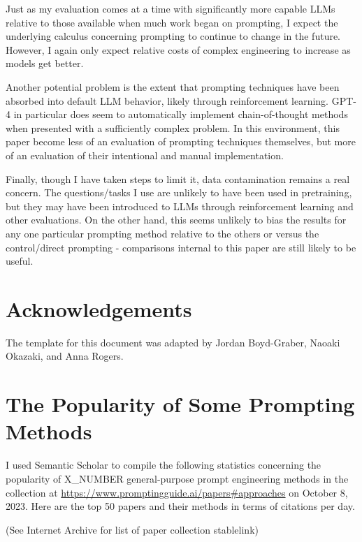 \documentclass[11pt]{article}
\begin{document}
Just as my evaluation comes at a time with significantly more capable LLMs relative to those available when much work began on prompting, I expect the underlying calculus concerning prompting to continue to change in the future. However, I again only expect relative costs of complex engineering to increase as models get better.

Another potential problem is the extent that prompting techniques have been absorbed into default LLM behavior, likely through reinforcement learning. GPT-4 in particular does seem to automatically implement chain-of-thought methods when presented with a sufficiently complex problem. In this environment, this paper become less of an evaluation of prompting techniques themselves, but more of an evaluation of their intentional and manual implementation.

Finally, though I have taken steps to limit it, data contamination remains a real concern. The questions/tasks I use are unlikely to have been used in pretraining, but they may have been introduced to LLMs through reinforcement learning and other evaluations. On the other hand, this seems unlikely to bias the results for any one particular prompting method relative to the others or versus the control/direct prompting - comparisons internal to this paper are still likely to be useful.

\section*{Acknowledgements}
The template for this document was adapted by Jordan Boyd-Graber, Naoaki Okazaki, and Anna Rogers.




\appendix

\section{The Popularity of Some Prompting Methods}

I used Semantic Scholar \cite{noauthor_semantic_nodate} to compile the following statistics concerning the popularity of X_NUMBER general-purpose prompt engineering methods in the collection at \url{https://www.promptingguide.ai/papers#approaches} on October 8, 2023. Here are the top 50 papers and their methods in terms of citations per day.

(See Internet Archive for list of paper collection stablelink)
\end{document}
